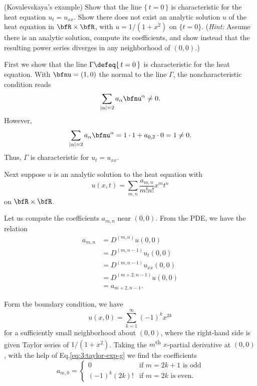 \begin{problem}
  (Kovalevskaya's example) Show that the line \(\{\,t=0\,\}\) is
  characteristic for the heat equation \(u_t=u_{xx}\). Show there does not
  exist an analytic solution \(u\) of the heat equation in
  \(\bfR\times\bfR\), with \(u=1/(1+x^2)\) on \(\{t=0\}\). (\emph{Hint:}
  Assume there is an analytic solution, compute its coefficients, and show
  instead that the resulting power series diverges in any neighborhood of
  \((0,0)\).)
\end{problem}
\begin{solution}
  First we show that the line \(\Gamma\defeq\{\,t=0\,\}\) is characteristic
  for the heat equation. With \(\bfnu=(1,0)\) the normal to the line
  \(\Gamma\), the noncharacteristic condition reads
  \[
    \sum_{|\alpha|=2} a_\alpha\bfnu^\alpha\neq 0.
  \]
  However,
  \[
    \sum_{|\alpha|=2} a_\alpha\bfnu^\alpha=%
    1\cdot 1+a_{0,2}\cdot 0=%
    1\neq%
    0.
  \]
  Thus, \(\Gamma\) is characteristic for \(u_t=u_{xx}\).

  Next suppose \(u\) is an analytic solution to the heat equation with
  \[
    u(x,t)=\sum_{m,n} \frac{a_{m,n}}{m!n!}x^mt^n
  \]
  on \(\bfR\times\bfR\).

  Let us compute the coefficients \(a_{m,n}\) near \((0,0)\). From the PDE,
  we have the relation
  \begin{equation}
    \label{eq:3:pde-relation}
    \begin{aligned}
      a_{m,n}
      &=D^{(m,n)} u(0,0)\\
      &=D^{(m,n-1)}u_t(0,0)\\
      &=D^{(m,n-1)}u_{xx}(0,0)\\
      &=D^{(m+2,n-1)}u(0,0)\\
      &=a_{m+2,n-1}.
    \end{aligned}
  \end{equation}

  Form the boundary condition, we have
  \begin{equation}
    \label{eq:3:taylor-exp-g}
    u(x,0)=\sum_{k=1}^\infty (-1)^k x^{2k}
  \end{equation}
  for a sufficiently small neighborhood about \((0,0)\), where the
  right-hand side is given Taylor series of \(1/(1+x^2)\). Taking the
  \(m\)\textsuperscript{th} \(x\)-partial derivative at \((0,0)\), with the
  help of Eq.\@ \eqref{eq:3:taylor-exp-g} we find the coefficients
  \begin{equation}
    \label{eq:3:boundary-relation}
    a_{m,0}=
    \begin{cases}
      0&\text{if \(m=2k+1\) is odd}\\
      (-1)^k(2k)!&\text{if \(m=2k\) is even.}
    \end{cases}
  \end{equation}


\end{solution}

